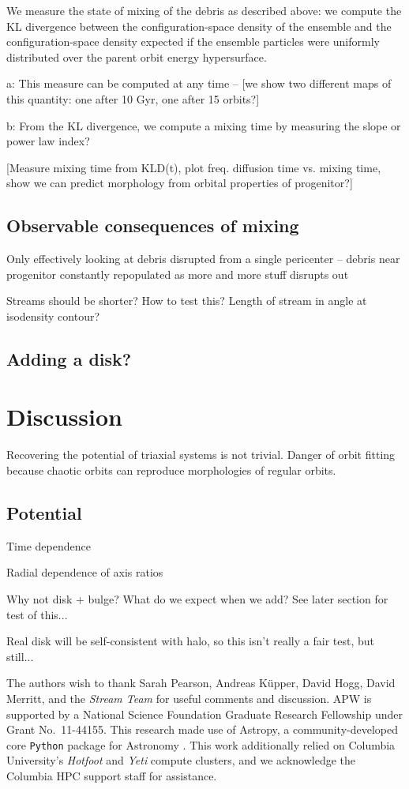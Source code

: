 \documentclass[letterpaper,12pt,preprint]{aastex}
\begin{document}
We measure the state of mixing of the debris as described above: we compute the KL divergence between the configuration-space density of the ensemble and the configuration-space density expected if the ensemble particles were uniformly distributed over the parent orbit energy hypersurface. 

a:
This measure can be computed at any time -- [we show two different maps of this quantity: one after 10 Gyr, one after 15 orbits?]

b: 
From the KL divergence, we compute a mixing time by measuring the slope or power law index?

[Measure mixing time from KLD(t), plot freq. diffusion time vs. mixing time, show we can predict morphology from orbital properties of progenitor?]

\subsection{Observable consequences of mixing}

Only effectively looking at debris disrupted from a single pericenter -- debris near progenitor constantly repopulated as more and more stuff disrupts out

Streams should be shorter? How to test this? Length of stream in angle at isodensity contour?

\subsection{Adding a disk?}

\section{Discussion}\label{sec:discussion}

Recovering the potential of triaxial systems is not trivial. Danger of orbit fitting because chaotic orbits can reproduce morphologies of regular orbits.

\subsection{Potential}

Time dependence

Radial dependence of axis ratios

Why not disk + bulge? What do we expect when we add? See later section for test of this...

Real disk will be self-consistent with halo, so this isn't really a fair test, but still...

\acknowledgements
The authors wish to thank Sarah Pearson, Andreas K\"upper, David Hogg, David Merritt, and the \emph{Stream Team} for useful comments and discussion.
APW is supported by a National Science Foundation Graduate Research Fellowship under Grant No.\ 11-44155. 
This research made use of Astropy, a community-developed core \texttt{Python} package for Astronomy \citep{astropy13}.
This work additionally relied on Columbia University's \emph{Hotfoot} and \emph{Yeti} compute clusters, and we acknowledge the Columbia HPC support staff for assistance.



\end{document}
